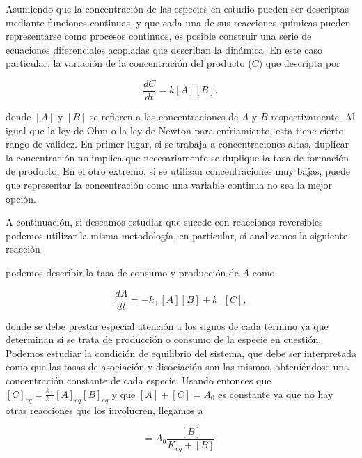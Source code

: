 Asumiendo que la concentración de las especies en estudio pueden ser descriptas mediante funciones continuas, y que cada una de sus reacciones químicas pueden representarse como procesos continuos, es posible construir una serie de ecuaciones diferenciales acopladas que describan la dinámica. En este caso particular, la variación de la concentración del producto ($C$) que descripta por\cite{Gillespie1977}

\begin{equation}
    \frac{dC}{dt} = k[A][B],
\end{equation}

\noindent donde $[A]$ y $[B]$ se refieren a las concentraciones de $A$ y $B$ respectivamente. Al igual que la ley de Ohm o la ley de Newton para enfriamiento, esta tiene cierto rango de validez. En primer lugar, si se trabaja a concentraciones altas, duplicar la concentración no implica que necesariamente se duplique la tasa de formación de producto. En el otro extremo, si se utilizan concentraciones muy bajas, puede que representar la concentración como una variable continua no sea la mejor opción\cite{Keener1998}.

A continuación, si deseamos estudiar que sucede con reacciones reversibles podemos utilizar la misma metodología, en particular, si analizamos la siguiente reacción

\begin{center}
\end{center}

\noindent podemos describir la tasa de consumo y producción de $A$ como

\begin{equation}
    \frac{dA}{dt} = -k_+ [A][B] + k_- [C],
\end{equation}

\noindent donde se debe prestar especial atención a los signos de cada término ya que determinan si se trata de producción o consumo de la especie en cuestión. Podemos estudiar la condición de equilibrio del sistema, que debe ser interpretada como que las tasas de asociación y disociación son las mismas, obteniéndose una concentración constante de cada especie. Usando entonces que $[C]_{eq} = \frac{k_+}{k_-} [A]_{eq} [B]_{eq}$ y que $[A]+[C] = A_0$ es constante ya que no hay otras reacciones que los involucren, llegamos a

\begin{equation}
    [C] = A_0 \frac{[B]}{K_{eq} + [B]},
\end{equation}

